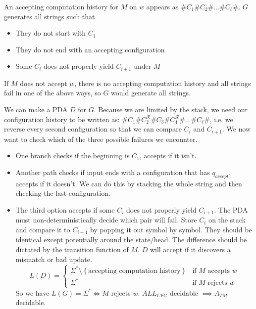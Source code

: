 \documentclass[12 pt]{article}
\begin{document}
An accepting computation history for $M$ on $w$ appears as $\# C_1 \#
C_2 \# \ldots \# C_\ell \#$. $G$ generates all strings such that
\begin{itemize}
\item They do not start with $C_1$
\item They do not end with an accepting configuration
\item Some $C_i$ does not properly yield $C_{i+1}$ under $M$
\end{itemize}
If $M$ does not accept $w$, there is no accepting computation history
and all strings fail in one of the above ways, so $G$ would generate
all strings.

We can make a PDA $D$ for $G$. Because we are limited by the stack, we
need our configuration history to be written as: $\# C_1 \#
C_2^{\mathcal{R}} \# C_3 \# C_4^{\mathcal{R}}\# \ldots \# C_\ell \#$,
i.e. we reverse every second configuration so that we can compare
$C_i$ and $C_{i+1}$. We now want to check which of the three possible
failures we encounter.
\begin{itemize}
\item One branch checks if the beginning is $C_1$, accepts if it
  isn't.
\item Another path checks if input ends with a configuration that has
  $q_{accept}$, accepts if it doesn't. We can do this by stacking the
  whole string and then checking the last configuration.
\item The third option accepts if some $C_i$ does not properly yield
  $C_{i+1}$. The PDA must non-deterministically decide which pair will
  fail. Store $C_i$ on the stack and compare it to $C_{i+1}$ by
  popping it out symbol by symbol. They should be identical except
  potentially around the state/head. The difference should be dictated
  by the transition function of $M$. $D$ will accept if it
  discovers a mismatch or bad update.
  $$L(D) =
  \begin{cases}
    \Sigma^* \setminus \left\{\text{accepting computation
        history}\right\} & \text{if }M \text{ accepts }w
    \\ \Sigma^* & \text{if }M \text{ rejects }w
  \end{cases}
  $$
  So we have $L(G) = \Sigma^* \iff M$ rejects $w$. $ALL_{CFG}$
  decidable $\implies A_{TM}$ decidable.
\end{itemize}
\end{document}
